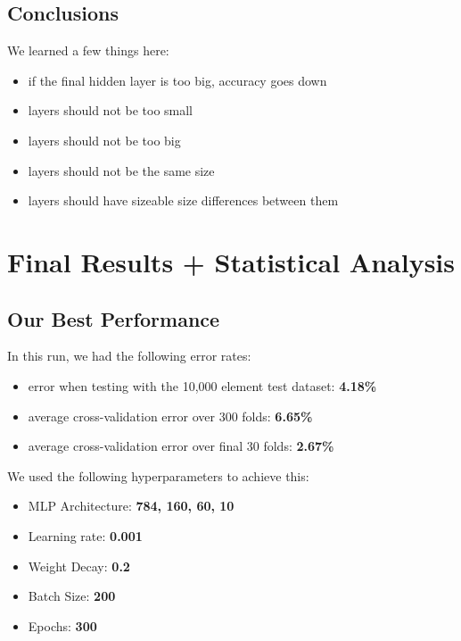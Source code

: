 \documentclass[11pt]{article}
\begin{document}
\subsection{Conclusions}\label{conclusions}

We learned a few things here:
\begin{itemize}
	\item if the final hidden layer is too big,
accuracy goes down
	\item layers should not be too small
	\item layers should not be too big
	\item layers should not be the same size
	\item layers should have sizeable size differences between them
\end{itemize}

\pagebreak

    \section{Final Results + Statistical
Analysis}\label{final-results-our-best-performance-statistical-analysis}

\subsection{Our Best Performance}

In this run, we had the following error rates:
\begin{itemize}
	\item error when testing with the 10,000 element test dataset: \textbf{4.18\%}
	\item average cross-validation error over 300 folds: \textbf{6.65\%}
	\item average cross-validation error over final 30 folds: \textbf{2.67\%}
\end{itemize} 


\hspace{-16px}We used the following hyperparameters to achieve this:
\begin{itemize}
	\item MLP Architecture: \textbf{784, 160, 60, 10}
	\item Learning rate: \textbf{0.001}
	\item Weight Decay:	\textbf{0.2}
	\item Batch Size: \textbf{200}
	\item Epochs: \textbf{300}
\end{itemize}
\end{document}
